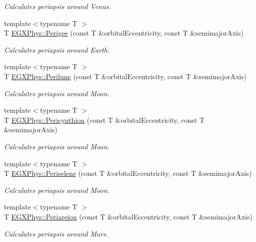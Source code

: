 \begin{DoxyCompactItemize}
\begin{DoxyCompactList}\small\item\em Calculates periapsis around Venus. \end{DoxyCompactList}\item 
{\footnotesize template$<$typename T $>$ }\\T \hyperlink{group___periapsis_gae2d053caf69cb0b4c3207064a2ab143a}{E\+G\+X\+Phys\+::\+Perigee} (const T \&orbital\+Eccentricity, const T \&semimajor\+Axis)
\begin{DoxyCompactList}\small\item\em Calculates periapsis around Earth. \end{DoxyCompactList}\item 
{\footnotesize template$<$typename T $>$ }\\T \hyperlink{group___periapsis_ga2cc7ab05e18d32c94d8d74972e032793}{E\+G\+X\+Phys\+::\+Perilune} (const T \&orbital\+Eccentricity, const T \&semimajor\+Axis)
\begin{DoxyCompactList}\small\item\em Calculates periapsis around Moon. \end{DoxyCompactList}\item 
{\footnotesize template$<$typename T $>$ }\\T \hyperlink{group___periapsis_gaeeba153b188cd06cbd233eaef12f0a6a}{E\+G\+X\+Phys\+::\+Pericynthion} (const T \&orbital\+Eccentricity, const T \&semimajor\+Axis)
\begin{DoxyCompactList}\small\item\em Calculates periapsis around Moon. \end{DoxyCompactList}\item 
{\footnotesize template$<$typename T $>$ }\\T \hyperlink{group___periapsis_ga255874374dde571531e443cdbef9ef0c}{E\+G\+X\+Phys\+::\+Periselene} (const T \&orbital\+Eccentricity, const T \&semimajor\+Axis)
\begin{DoxyCompactList}\small\item\em Calculates periapsis around Moon. \end{DoxyCompactList}\item 
{\footnotesize template$<$typename T $>$ }\\T \hyperlink{group___periapsis_ga0617ba07a30b0fd0544c02f691bfae26}{E\+G\+X\+Phys\+::\+Periareion} (const T \&orbital\+Eccentricity, const T \&semimajor\+Axis)
\begin{DoxyCompactList}\small\item\em Calculates periapsis around Mars. \end{DoxyCompactList}\item 

\end{DoxyCompactItemize}
